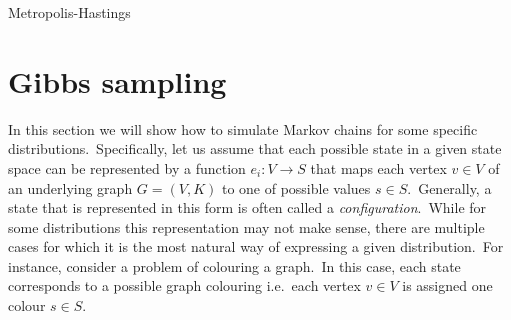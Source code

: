\documentclass[shortabstract, english, lic]{iithesis}
\theoremstyle{default_theorem_style}\newtheorem{theorem}{Theorem}
\theoremstyle{default_theorem_style}\newtheorem{definition}{Definition}
\begin{document}
\begin{algorithm}[tb]
\caption{Metropolis-Hastings}\label{alg:metropolis_hastings}
\begin{algorithmic}[1]
\Else
\EndIf
{}
\end{algorithmic}
\end{algorithm}

\section{Gibbs sampling}\label{sec:gibbs_sampling}

\noindent In this section we will show how to simulate Markov chains for some specific distributions.\ Specifically,
let us assume that each possible state in a given state space can be represented by a function $e_i : V \to S$ that
maps each vertex $v \in V$ of an underlying graph $G = (V, K)$ to one of possible values $s \in S$.\ Generally, a state
that is represented in this form is often called a \textit{configuration}.\ While for some distributions this
representation may not make sense, there are multiple cases for which it is the most natural way of expressing a
given distribution.\ For instance, consider a problem of colouring a graph.\ In this case, each state corresponds to a
possible graph colouring i.e.\ each vertex $v \in V$ is assigned one colour $s \in S$.\newline
\end{document}
